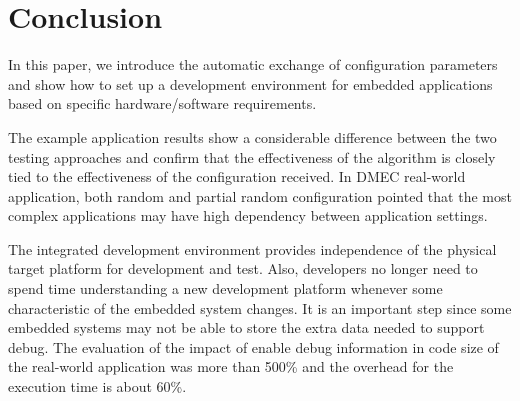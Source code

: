 \documentclass[conference]{IEEEtran}
\begin{document}
\section{Conclusion}
In this paper, we introduce the automatic exchange of configuration parameters and show how to set up a development environment for embedded applications based on specific hardware/software requirements.

The example application results show a considerable difference between the two testing approaches and confirm that the effectiveness of the algorithm is closely tied to the effectiveness of the configuration received. In DMEC real-world application, both random and partial random configuration pointed that the most complex applications may have high dependency between application settings.

The integrated development environment provides independence of the physical target platform for development and test. Also, developers no longer need to spend time understanding a new development platform whenever some characteristic of the embedded system changes. It is an important step since some embedded systems may not be able to store the extra data needed to support debug. The evaluation of the impact of enable debug information in code size of the real-world application was more than 500\% and the overhead for the execution time is about 60\%.




\end{document}

